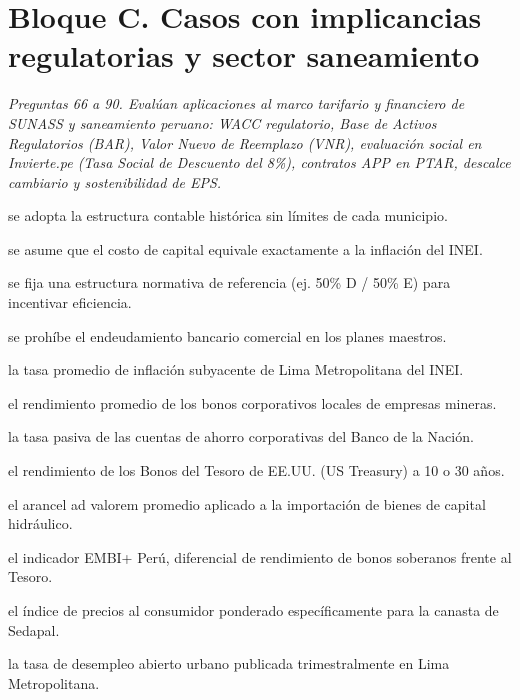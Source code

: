 \section*{Bloque C. Casos con implicancias regulatorias y sector saneamiento}

\noindent\textit{Preguntas 66 a 90. Evalúan aplicaciones al marco tarifario y financiero de SUNASS y saneamiento peruano: WACC regulatorio, Base de Activos Regulatorios (BAR), Valor Nuevo de Reemplazo (VNR), evaluación social en Invierte.pe (Tasa Social de Descuento del 8\%), contratos APP en PTAR, descalce cambiario y sostenibilidad de EPS.}

\begin{opts}
    \item se adopta la estructura contable histórica sin límites de cada municipio.
    \item se asume que el costo de capital equivale exactamente a la inflación del INEI.
    \item se fija una estructura normativa de referencia (ej. 50\% D / 50\% E) para incentivar eficiencia.
    \item se prohíbe el endeudamiento bancario comercial en los planes maestros.
\end{opts}

\begin{opts}
    \item la tasa promedio de inflación subyacente de Lima Metropolitana del INEI.
    \item el rendimiento promedio de los bonos corporativos locales de empresas mineras.
    \item la tasa pasiva de las cuentas de ahorro corporativas del Banco de la Nación.
    \item el rendimiento de los Bonos del Tesoro de EE.UU. (US Treasury) a 10 o 30 años.
\end{opts}

\begin{opts}
    \item el arancel ad valorem promedio aplicado a la importación de bienes de capital hidráulico.
    \item el indicador EMBI+ Perú, diferencial de rendimiento de bonos soberanos frente al Tesoro.
    \item el índice de precios al consumidor ponderado específicamente para la canasta de Sedapal.
    \item la tasa de desempleo abierto urbano publicada trimestralmente en Lima Metropolitana.
\end{opts}

